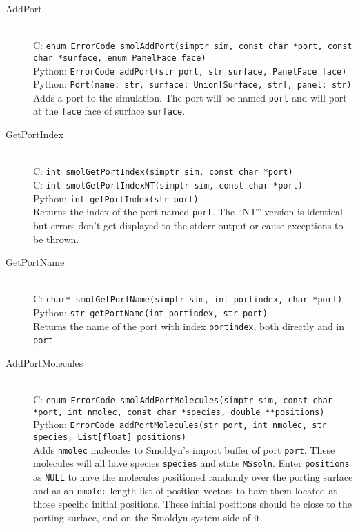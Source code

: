 \documentclass {book}
\newcommand {\ttt} {\texttt}
\begin{document}
\begin{description}

\item[AddPort]
\hfill \\
C: \ttt{enum ErrorCode smolAddPort(simptr sim, const char *port, const char *surface, enum PanelFace face)}\\
Python: \ttt{ErrorCode addPort(str port, str surface, PanelFace face)}\\
Python: \ttt{Port(name: str, surface: Union[Surface, str], panel: str)}\\
Adds a port to the simulation. The port will be named \ttt{port} and will port at the \ttt{face} face of surface \ttt{surface}.

\item[GetPortIndex]
\hfill \\
C: \ttt{int smolGetPortIndex(simptr sim, const char *port)}\\
C: \ttt{int smolGetPortIndexNT(simptr sim, const char *port)}\\
Python: \ttt{int getPortIndex(str port)}\\
Returns the index of the port named \ttt{port}. The ``NT'' version is identical but errors don't get displayed to the stderr output or cause exceptions to be thrown.

\item[GetPortName]
\hfill \\
C: \ttt{char* smolGetPortName(simptr sim, int portindex, char *port)}\\
Python: \ttt{str getPortName(int portindex, str port)}\\
Returns the name of the port with index \ttt{portindex}, both directly and in \ttt{port}.

\item[AddPortMolecules]
\hfill \\
C: \ttt{enum ErrorCode smolAddPortMolecules(simptr sim, const char *port, int nmolec, const char *species, double **positions)}\\
Python: \ttt{ErrorCode addPortMolecules(str port, int nmolec, str species, List[float] positions)}\\
Adds \ttt{nmolec} molecules to Smoldyn's import buffer of port \ttt{port}. These molecules will all have species \ttt{species} and state \ttt{MSsoln}. Enter \ttt{positions} as \ttt{NULL} to have the molecules positioned randomly over the porting surface and as an \ttt{nmolec} length list of position vectors to have them located at those specific initial positions. These initial positions should be close to the porting surface, and on the Smoldyn system side of it.


\end{description}
\end{document}
